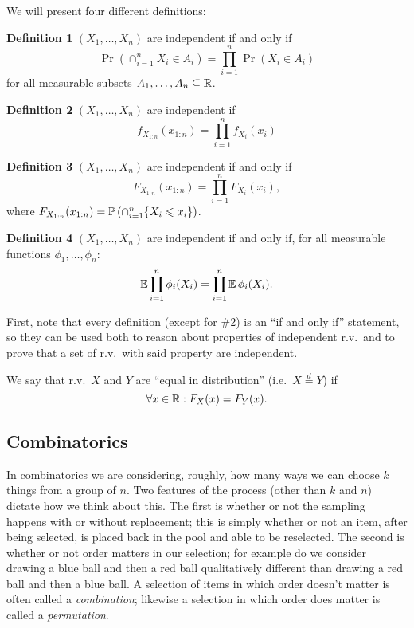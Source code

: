 \begin{definition}[Independence]
    We will present four different definitions: \newline

    \textbf{Definition 1}
    $(X_1, \hdots, X_n)$ are independent if and only if
    \[
        \Pr(\cap_{i=1}^{n} X_i \in A_i)
        =
        \prod_{i=1}^{n} \Pr(X_i \in A_i)
    \]
    for all measurable subsets $A_1, \hdots, A_n \subseteq \mathbb R$.

    \textbf{Definition 2}
    $(X_1, \hdots, X_n)$ are independent if
    \[
        f_{X_{1:n}}(x_{1:n})
        =
        \prod_{i=1}^{n} f_{X_i}(x_i)
    \]

    \textbf{Definition 3}
    $(X_1, \hdots, X_n)$ are independent if and only if 
    \[
        F_{X_{1:n}}(x_{1:n})
        =
        \prod_{i=1}^{n} F_{X_i}(x_i),
    \]
    where $F_{X_{1:n}}(x_{1:n}) = \operatorname*{\mathbb{P}} \left( \cap_{i=1}^{n} \{X_i \leqslant x_i\} \right)$.

    \textbf{Definition 4}
    $(X_1, \hdots, X_n)$ are independent if and only if, for all 
    measurable functions $\phi_1, \hdots, \phi_n$:
    \[
        \operatorname*{\mathbb{E}} \prod_{i=1}^{n} \phi_i(X_i)
        =
        \prod_{i=1}^{n} \operatorname*{\mathbb{E}} \phi_i(X_i).
    \]
\end{definition}

First, note that every definition (except for \#2) is an ``if and only if'' statement,
so they can be used both to reason about properties of independent r.v.\ and 
to prove that a set of r.v.\ with said property are independent.

\begin{definition}
    We say that r.v.\ $X$ and $Y$ are ``equal in distribution'' (i.e.\ $X \stackrel{d}{=} Y$) 
    if
    \[
        \forall x \in \mathbb R:
        F_X(x) = F_Y(x).
    \] 
\end{definition}

\subsection{Combinatorics}

In combinatorics we are considering, roughly, how many ways we can choose $k$ things from a group of $n$.
Two features of the process (other than $k$ and $n$) dictate how we think about this. 
The first is whether or not the sampling happens with or without replacement; this is simply 
whether or not an item, after being selected, is placed back in the pool and able to be reselected.
The second is whether or not order matters in our selection; for example do we consider drawing 
a blue ball and then a red ball qualitatively different than drawing a red ball and then a blue ball.
A selection of items in which order doesn't matter is often called a \emph{combination}; likewise 
a selection in which order does matter is called a \emph{permutation}.

